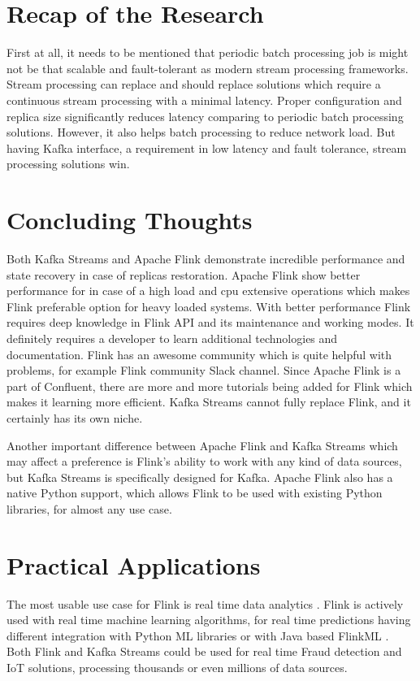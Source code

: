 \section{Recap of the Research}\label{sec:recap-of-the-research}
First at all, it needs to be mentioned that periodic batch processing job
is might not be that scalable and fault-tolerant as modern
stream processing frameworks.
Stream processing can replace and should replace solutions which require
a continuous stream processing with a minimal latency.
Proper configuration and replica size significantly reduces latency comparing
to periodic batch processing solutions.
However, it also helps batch processing to reduce network load.
But having Kafka interface, a requirement in low latency and fault tolerance,
stream processing solutions win.

\section{Concluding Thoughts}\label{sec:concluding-thoughts}
Both Kafka Streams and Apache Flink demonstrate incredible performance
and state recovery in case of replicas restoration.
Apache Flink show better performance for in case of a high load
and cpu extensive operations which makes Flink preferable
option for heavy loaded systems.
With better performance Flink requires deep knowledge in Flink
API and its maintenance and working modes.
It definitely requires a developer to learn additional technologies and documentation.
Flink has an awesome community which is quite helpful with problems,
for example Flink community Slack channel.
Since Apache Flink is a part of Confluent, there are more and more tutorials
being added for Flink which makes it learning more efficient.
Kafka Streams cannot fully replace Flink, and it certainly has its own niche.

Another important difference between Apache Flink and Kafka Streams which
may affect a preference is Flink's ability to work with any kind of data
sources, but Kafka Streams is specifically designed for Kafka.
Apache Flink also has a native Python support, which allows Flink
to be used with existing Python libraries, for almost any use case.

\section{Practical Applications}\label{sec:practical-applications}
The most usable use case for Flink is real time data analytics \cite{flink_use_cases}.
Flink is actively used with real time machine learning algorithms, for
real time predictions having different integration with Python ML libraries
or with Java based FlinkML \cite{flink_ml}.
Both Flink and Kafka Streams could be used for real time Fraud detection
and IoT solutions, processing thousands or even millions of data sources.


